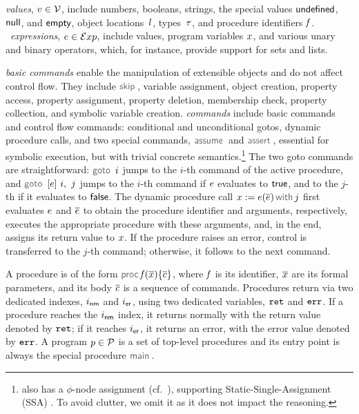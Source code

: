 \vspace{5pt}
\noindent \jsil \emph{values}, $v \in \mathcal{V}$, include numbers, booleans, strings, the special values ${\sf undefined}$, ${\sf null}$, and ${\sf empty}$, object locations~$l$, types~$\tau$, and procedure identifiers $\mathit{f}$.
\jsil~\emph{expressions}, $e \in \mathcal{E}xp$, include \jsil values, \jsil program variables $x$, and various unary and binary operators, which, for instance, provide support for sets and lists. 

\jsil \emph{basic commands} enable the manipulation of extensible objects and do not affect control flow. 
They include $\jsilskip$, variable assignment, object creation, property access, property assignment, property deletion, membership check,  property collection, and symbolic variable creation. 
%
\jsil \emph{commands} include \jsil basic commands and control flow commands: conditional and unconditional gotos, dynamic procedure calls, and two special commands, $\assume$ and $\jassert$, essential for symbolic execution, but with trivial concrete semantics.\footnote{\jsil also has a $\phi$-node assignment (cf.~\cite{javert}), supporting Static-Single-Assignment (SSA) \cite{SSA}. To avoid clutter, we omit it as it does not impact the reasoning.} 
The two goto commands are straightforward: $\goto \ i$ jumps to the $i$-th command of the active procedure, and $\ifgoto{\jsilexpr}{i}{j}$ jumps to the $i$-th command if $e$ evaluates to ${\sf true}$, and to the $j$-th if it evaluates to ${\sf false}$. 
The dynamic procedure call $\jsilcall{\jvar}{\jsilexpr}{\jvec{\jsilexpr}}{j}$ first evaluates  $e$ and $\overline{e}$ to obtain the procedure identifier and arguments, respectively, executes the appropriate procedure with these arguments, and, in the end, assigns its return value to $x$.
If the procedure raises an error, control is transferred to the $j$-th command; otherwise, it follows to the next command. 

A \jsil procedure is of the form $\procedure{\pid}{\jvec{\jvar}}{\jvec{\jcmd}}$, where $\mathit{f}$ is its identifier, $\overline{x}$ are its formal parameters, and its body ${\overline{c}}$  is a sequence of \jsil commands. Procedures return via two dedicated indexes, $i_{{\sf nm}}$ and $i_{{\sf er}}$, using two dedicated variables, $\mathtt{ret}$ and $\mathtt{err}$. If a procedure reaches the $i_{{\sf nm}}$ index, it returns normally with the return value denoted by $\mathtt{ret}$; if it reaches $i_{{\sf er}}$, it returns an error, with the error value denoted by $\mathtt{err}$.
A \jsil program $p \in \mathcal{P}$ is a set of top-level procedures and its entry point is always the special procedure $\jsilmain$\hspace{-2pt}.


